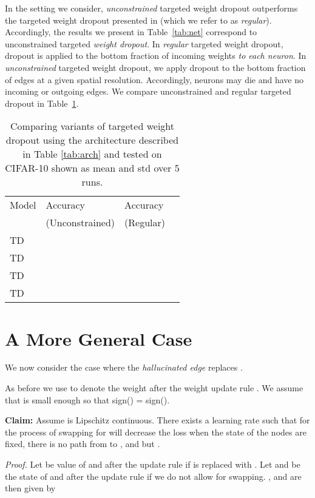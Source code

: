 \documentclass{article}
\begin{document}
In the setting we consider, \textit{unconstrained} targeted weight dropout outperforms the targeted weight dropout presented in \cite{td} (which we refer to as \textit{regular}). Accordingly, the results we present in Table~\ref{tab:net} correspond to unconstrained targeted \textit{weight dropout}. In \textit{regular} targeted weight dropout, dropout is applied to the bottom  fraction of incoming weights \textit{to each neuron}. In \textit{unconstrained} targeted weight dropout, we apply dropout to the bottom  fraction of edges at a given spatial resolution. Accordingly, neurons may die and have no incoming or outgoing edges. We compare unconstrained and regular targeted dropout in Table~\ref{tab:td}.
\begin{table}[H]
  \caption{Comparing variants of targeted weight dropout using the architecture described in Table \ref{tab:arch} and tested on CIFAR-10 shown as mean and std over 5 runs.}
  \label{tab:td}
  \centering
  \begin{tabular}{llll}
    \toprule
    Model      & Accuracy  & Accuracy \\
          & (Unconstrained)  & (Regular) \\
    \midrule
    TD  &   &  \\
    TD  &  &  \\
    TD  &  &  \\
    TD  &  &  \\
    \bottomrule
  \end{tabular}
\end{table}

\section{A More General Case} \label{section:formal-extensions}

We now consider the case where the \textit{hallucinated edge}  replaces .

As before we use  to denote the weight  after the weight update rule . We assume that  is small enough so that sign() = sign().

\textbf{Claim:} Assume  is Lipschitz continuous. There exists a learning rate  such that for  the process of swapping  for  will decrease the loss when the state of the nodes are fixed, there is no path from  to , and  but .

\textit{Proof.} Let  be value of  and  after the update rule if  is replaced with . Let  and  be the state of  and  after the update rule if we do not allow for swapping. ,  and  are then given by
\end{document}
